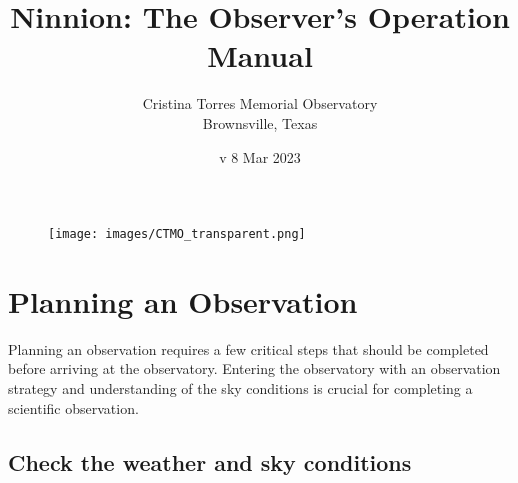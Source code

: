 \documentclass{article}
\title{Ninnion: The Observer's Operation Manual}
\author{Cristina Torres Memorial Observatory \\
	Brownsville, Texas}
\date{v 8 Mar 2023}
\begin{document}
	
	\maketitle
	
	\begin{figure}[b]
		\centering
		\texttt{[image: images/CTMO\_transparent.png]}
	\end{figure}
	
	\newpage
	\tableofcontents
	
	\newpage
	\section{Planning an Observation}
	\label{sec:planning-an-observation}
	
	Planning an observation requires a few critical steps that should be completed before arriving at the observatory. Entering the observatory with an observation strategy and understanding of the sky conditions is crucial for completing a scientific observation.
	
	\subsection{Check the weather and sky conditions}
	\label{sec:check-the-weather-and-sky-conditions}
	
\end{document}
